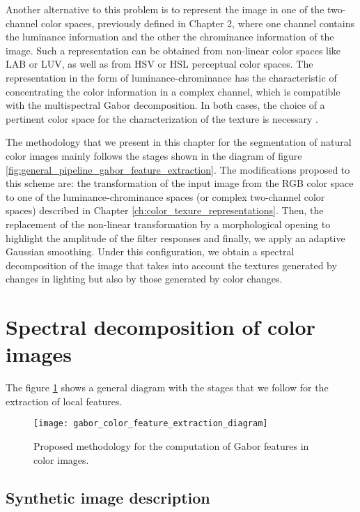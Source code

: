Another alternative to this problem is to represent the image in one of the two-channel color spaces, previously defined in Chapter 2, where one channel contains the luminance information and the other the chrominance information of the image. Such a representation can be obtained from non-linear color spaces like LAB or LUV, as well as from HSV or HSL perceptual color spaces. The representation in the form of luminance-chrominance has the characteristic of concentrating the color information in a complex channel, which is compatible with the multispectral Gabor decomposition. In both cases, the choice of a pertinent color space for the characterization of the texture is necessary \citep{Qazi.Alata.ea:PR:2011}.

The methodology that we present in this chapter for the segmentation of natural color images mainly follows the stages shown in the diagram of figure \ref{fig:general_pipeline_gabor_feature_extraction}. The modifications proposed to this scheme are: the transformation of the input image from the RGB color space to one of the luminance-chrominance spaces (or complex two-channel color spaces) described in Chapter \ref{ch:color_texure_representations}. Then, the replacement of the non-linear transformation by a morphological opening to highlight the amplitude of the filter responses and finally, we apply an adaptive Gaussian smoothing. Under this configuration, we obtain a spectral decomposition of the image that takes into account the textures generated by changes in lighting but also by those generated by color changes. 

\section{Spectral decomposition of color images}
The figure \ref{fig:proposed_pipeline_gabor_feature_extraction} shows a general diagram with the stages that we follow for the extraction of local features.

\begin{figure}[!ht]
	\centering
	\texttt{[image: gabor\_color\_feature\_extraction\_diagram]}
	\caption{Proposed methodology for the computation of Gabor features in color images.}\label{fig:proposed_pipeline_gabor_feature_extraction}
\end{figure}


\subsection{Synthetic image description}

